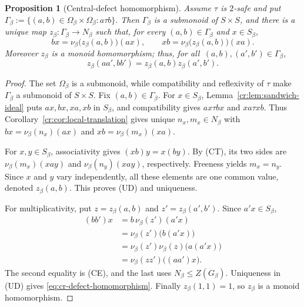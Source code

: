 \documentclass[10pt,a4paper]{article}
\newtheorem{proposition}[theorem]{Proposition}
\theoremstyle{definition}
\theoremstyle{remark}
\begin{document}
\begin{proposition}[Central-defect homomorphism]
\label{cr:lem:uniform-defect}
Assume \(\tau\) is \(2\)-safe and put
\(\Gamma_\beta:=\{(a,b)\in\Omega_\beta\times\Omega_\beta:a\tau b\}.\)
Then \(\Gamma_\beta\) is a submonoid of \(S\times S\), and there is a unique
map \(z_\beta:\Gamma_\beta\to N_\beta\) such that, for every
\((a,b)\in\Gamma_\beta\) and \(x\in S_\beta\),
\[
bx=\nu_\beta\bigl(z_\beta(a,b)\bigr)(ax),
\qquad
xb=\nu_\beta\bigl(z_\beta(a,b)\bigr)(xa).
\tag{UD}
\]
Moreover \(z_\beta\) is a monoid homomorphism; thus, for all
$\,(a,b),(a',b')\in\Gamma_\beta$,
\begin{equation}
z_\beta(aa',bb')=z_\beta(a,b)z_\beta(a',b').
\label{eq:cr-defect-homomorphism}
\end{equation}
\end{proposition}

\begin{proof}
The set \(\Omega_\beta\) is a submonoid, while compatibility and reflexivity
of \(\tau\) make \(\Gamma_\beta\) a submonoid of \(S\times S\).
Fix \((a,b)\in\Gamma_\beta\).  For \(x\in S_\beta\),
Lemma~\ref{cr:lem:sandwich-ideal} puts \(ax,bx,xa,xb\) in \(S_\beta\), and
compatibility gives \(ax\tau bx\) and \(xa\tau xb\).  Thus
Corollary~\ref{cr:cor:local-translation} gives unique \(n_x,m_x\in N_\beta\)
with
\(bx=\nu_\beta(n_x)(ax)\) and \(xb=\nu_\beta(m_x)(xa)\).

For \(x,y\in S_\beta\), associativity gives \((xb)y=x(by)\).  By
\textup{(CT)}, its two sides are
\(\nu_\beta(m_x)(xay)\) and \(\nu_\beta(n_y)(xay)\), respectively.
Freeness yields \(m_x=n_y\).  Since \(x\) and \(y\) vary independently,
all these elements are one common value, denoted \(z_\beta(a,b)\).  This
proves \textup{(UD)} and uniqueness.

For multiplicativity, put \(z=z_\beta(a,b)\) and
\(z'=z_\beta(a',b')\).  Since \(a'x\in S_\beta\),
\[
\begin{aligned}
(bb')x
&=b\,\nu_\beta(z')(a'x)\\
&=\nu_\beta(z')\bigl(b(a'x)\bigr)\\
&=\nu_\beta(z')\nu_\beta(z)\bigl(a(a'x)\bigr)\\
&=\nu_\beta(zz')\bigl((aa')x\bigr).
\end{aligned}
\]
The second equality is \textup{(CE)}, and the last uses
\(N_\beta\le Z(G_\beta)\).  Uniqueness in \textup{(UD)} gives
\eqref{eq:cr-defect-homomorphism}.  Finally \(z_\beta(1,1)=1\), so \(z_\beta\) is a monoid
homomorphism.
\end{proof}
\end{document}
